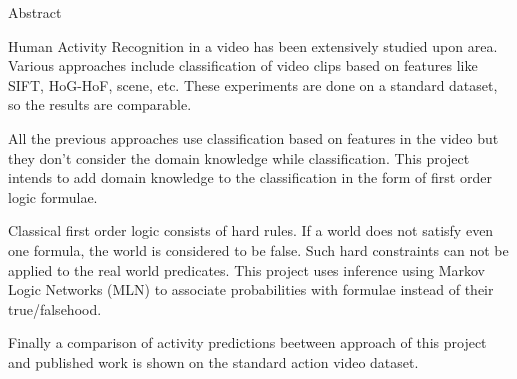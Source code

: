 \begin{center}
\LARGE{Abstract}
\end{center}

\vspace{0.5in}

Human Activity Recognition in a video has been extensively studied upon area. 
Various approaches include classification of video clips based on features like SIFT, HoG-HoF, scene, etc.
These experiments are done on a standard dataset, so the results are comparable.

All the previous approaches use classification based on features in the video but they don't consider the domain knowledge while classification.
This project intends to add domain knowledge to the classification in the form of first order logic formulae.

Classical first order logic consists of hard rules. 
If a world does not satisfy even one formula, 
the world is considered to be false. 
Such hard constraints can not be applied to the real world predicates. 
This project uses inference using Markov Logic Networks (MLN) 
to associate probabilities with formulae instead of their true/falsehood.

Finally a comparison of activity predictions beetween 
approach of this project and 
published work is shown on the standard action video dataset.
